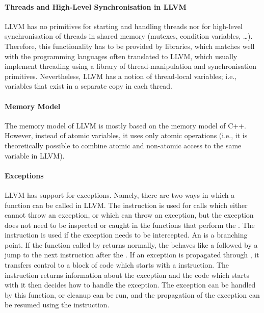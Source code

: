 \paragraph{Threads and High-Level Synchronisation in LLVM}

LLVM has no primitives for starting and handling threads nor for high-level synchronisation of threads in shared memory (mutexes, condition variables, …).
Therefore, this functionality has to be provided by libraries, which matches well with the programming languages often translated to LLVM,
which usually implement threading using a library of thread-manipulation and
synchronisation primitives.
Nevertheless, LLVM has a notion of thread-local variables; i.e., variables that exist in a separate copy in each thread.

\paragraph{Memory Model}

The memory model of LLVM is mostly based on the memory model of C++.
However, instead of
atomic variables, it uses only atomic operations (i.e., it is theoretically
possible to combine atomic and non-atomic access to the same variable in LLVM).

\paragraph{Exceptions}

LLVM has support for exceptions.
Namely, there are two ways in which a function can be called in LLVM.
The  instruction is used for calls which either cannot throw an
exception, or which can throw an exception, but the exception does not need to
be inspected or caught in the functions that perform the .
The  instruction is used if the exception needs to be intercepted.
An  is a branching point.
If the function called by  returns normally, the 
behaves like a  followed by a jump to the next instruction after the
.
If an exception is propagated through , it transfers control
to a block of code which starts with a  instruction.
The  instruction returns information about the exception and the
code which starts with it then decides how to handle the exception.
The exception can be
handled by this function, or cleanup can be run, and the propagation of the
exception can be resumed using the  instruction.

